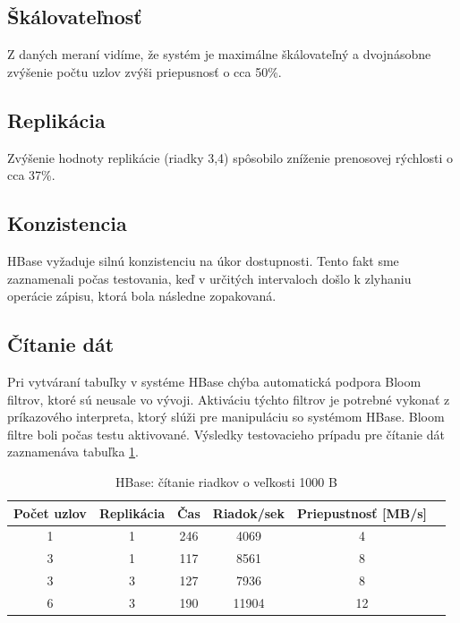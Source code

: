 \documentclass[11pt,twoside,a4paper]{book}
\begin{document}
\subsection*{Škálovateľnosť}

Z daných meraní vidíme, že systém je maximálne škálovateľný a dvojnásobne zvýšenie počtu uzlov zvýši priepusnosť o cca 50\%.

\subsection*{Replikácia}

Zvýšenie hodnoty replikácie (riadky 3,4) spôsobilo zníženie prenosovej rýchlosti o cca 37\%.

\subsection*{Konzistencia}

HBase vyžaduje silnú konzistenciu na úkor dostupnosti. Tento fakt sme zaznamenali počas testovania, keď v určitých intervaloch došlo k zlyhaniu operácie zápisu, ktorá bola následne zopakovaná.

\subsection*{Čítanie dát}

Pri vytváraní tabuľky v systéme HBase chýba automatická podpora Bloom filtrov, ktoré sú neusale vo vývoji. Aktiváciu týchto filtrov je potrebné vykonať z príkazového interpreta, ktorý slúži pre manipuláciu so systémom HBase. Bloom filtre boli počas testu aktivované. Výsledky testovacieho prípadu pre čítanie dát zaznamenáva tabuľka \ref{tab:HPerf2}.

\begin{table}[hp]
\begin{center}
\begin{tabular}{|c|c|c|c|c|c|}

\hline Počet uzlov & Replikácia & Čas & Riadok/sek & Priepustnosť [MB/s]\\ 
\hline
\hline 1 & 1 & 246 & 4069 & 4\\ 
\hline 3 & 1 & 117 & 8561 & 8\\ 
\hline 3 & 3 & 127 & 7936 & 8\\ 
\hline 6 & 3 & 190 & 11904 & 12\\ 
\hline
\end{tabular} 
\end{center}
\caption{HBase: čítanie riadkov o veľkosti 1000 B}
\label{tab:HPerf2}
\end{table}
\end{document}

